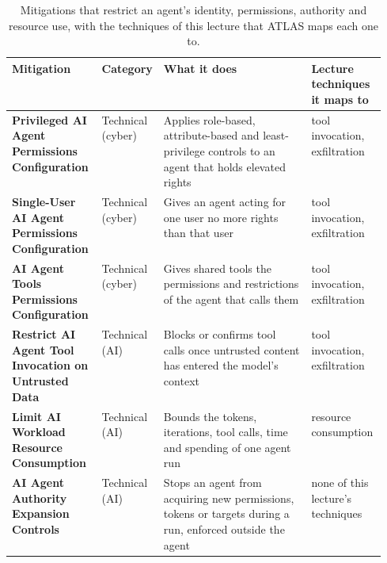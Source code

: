 \begin{table}[tb]
  \caption{Mitigations that restrict an agent's identity, permissions, authority and resource use,
  with the techniques of this lecture that ATLAS maps each one to.}
  \label{tab:mitigations-authority}
  \begin{adjustbox}{width=\linewidth}\begin{tabularx}{\linewidth}{L{0.24\linewidth}L{0.11\linewidth}XL{0.2\linewidth}}
    \toprule
    \textbf{Mitigation} & \textbf{Category} & \textbf{What it does} & \textbf{Lecture techniques it maps to} \\
    \midrule
    \textbf{Privileged AI Agent Permissions Configuration} & Technical (cyber) & Applies role-based,
    attribute-based and least-privilege controls to an agent that holds elevated rights &
    tool invocation, exfiltration \\
    \textbf{Single-User AI Agent Permissions Configuration} & Technical (cyber) & Gives an agent
    acting for one user no more rights than that user & tool invocation, exfiltration \\
    \textbf{AI Agent Tools Permissions Configuration} & Technical (cyber) & Gives shared tools the
    permissions and restrictions of the agent that calls them & tool invocation, exfiltration \\
    \textbf{Restrict AI Agent Tool Invocation on Untrusted Data} & Technical (AI) & Blocks or
    confirms tool calls once untrusted content has entered the model's context & tool invocation,
    exfiltration \\
    \textbf{Limit AI Workload Resource Consumption} & Technical (AI) & Bounds the tokens,
    iterations, tool calls, time and spending of one agent run & resource consumption \\
    \textbf{AI Agent Authority Expansion Controls} & Technical (AI) & Stops an agent from acquiring
    new permissions, tokens or targets during a run, enforced outside the agent & none of this
    lecture's techniques \\
    \bottomrule
  \end{tabularx}\end{adjustbox}
\end{table}

